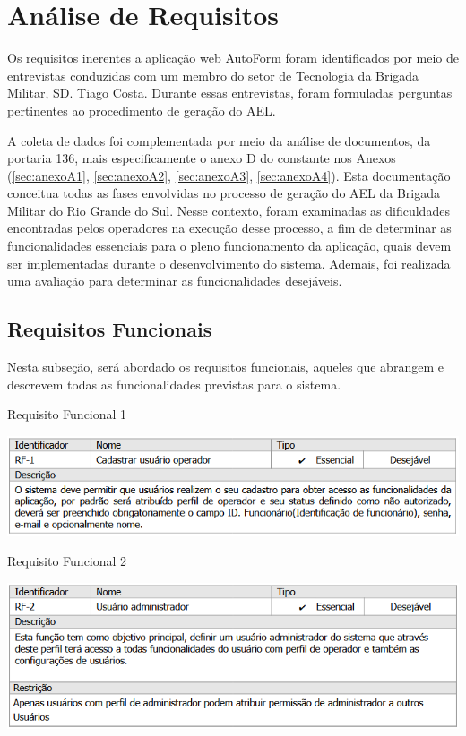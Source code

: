 \section{Análise de Requisitos}
Os requisitos inerentes a aplicação web AutoForm foram identificados por meio de entrevistas conduzidas com um membro do setor de Tecnologia da Brigada Militar, SD. Tiago Costa. Durante essas entrevistas, foram formuladas perguntas pertinentes ao procedimento de geração do AEL.

A coleta de dados foi complementada por meio da análise de documentos, da portaria 136, mais especificamente o anexo D do \cite{ExércitoBrasileiro} constante nos Anexos (\ref{sec:anexoA1}, \ref{sec:anexoA2}, \ref{sec:anexoA3}, \ref{sec:anexoA4}). Esta documentação conceitua todas as fases envolvidas no processo de geração do AEL da Brigada Militar do Rio Grande do Sul. Nesse contexto, foram examinadas as dificuldades  encontradas pelos operadores na execução desse processo, a fim de determinar as funcionalidades essenciais para o pleno funcionamento da aplicação, quais devem ser implementadas durante o desenvolvimento do sistema. Ademais, foi realizada uma avaliação para determinar as funcionalidades desejáveis.

\subsection{Requisitos Funcionais}
Nesta subseção, será abordado os requisitos funcionais, aqueles que abrangem e descrevem todas as funcionalidades previstas para o sistema. 

\begin{table}[h]
    \caption{Requisito Funcional 1}
    \centering
    \includegraphics[scale=0.9]{imagens/rf01.png}
    \label{tab:rf01}
\end{table}

\begin{table}[h]
    \caption{Requisito Funcional 2}
    \centering
    \includegraphics[scale=0.9]{imagens/rf02.png}
    \label{tab:rf02}
\end{table}

